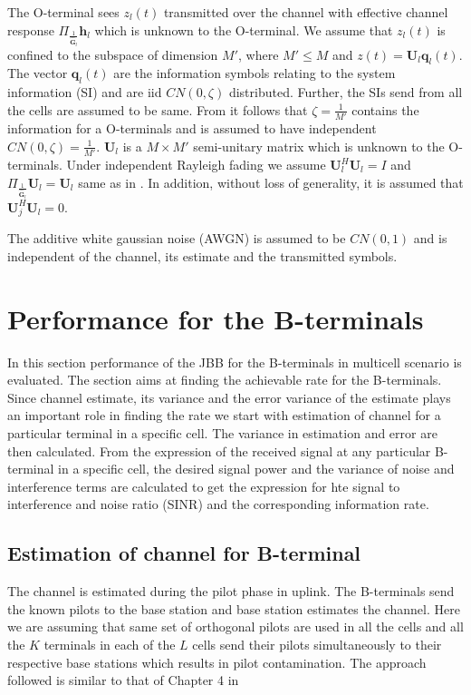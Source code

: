 \documentclass[10pt, a4paper, twoside,fleqn]{article}
\begin{document}
The O-terminal sees $z_l(t)$ transmitted over the channel with effective channel response $\Pi_{\frac{1}{\pmb{\hat G}_l}}\pmb{h}_l$ which is unknown to the O-terminal. We assume that $z_l(t)$ is confined to the subspace of dimension $M'$, where $M'\leq M$ and $z(t) = \pmb{U}_l\pmb{q}_l(t)$. The vector $\pmb{q}_l(t)$ are the information symbols relating to the system information (SI) and are iid $CN(0,\zeta)$ distributed. Further, the SIs send from all the cells are assumed to be same. From \cite{bib:jbb} it follows that $\zeta=\frac{1}{M'}$ contains the information for a O-terminals  and is assumed to have independent $CN(0, \zeta)=\frac{1}{M'}$. $\pmb{U}_l$ is a $M\times M'$ semi-unitary matrix which is unknown to the O-terminals. Under independent Rayleigh fading we assume $\pmb{U}_l^H\pmb{U}_l=I$ and $\Pi_{\frac{1}{\pmb{\hat G}_l}}\pmb{U}_l=\pmb{U}_l$ same as in \cite{bib:jbb}. In addition, without loss of generality, it is assumed that $\pmb{U}_j^H\pmb{U}_l=0$.

The additive white gaussian noise (AWGN) is assumed to be $CN(0,1)$ and is independent of the channel, its estimate and the transmitted symbols.

\section{Performance for the B-terminals}
	In this section performance of the JBB for the B-terminals in multicell scenario is evaluated. The section aims at finding the achievable rate for the B-terminals. Since channel estimate, its variance and the error variance of the estimate plays an important role in finding the rate we start with estimation of channel for a particular terminal in a specific cell. The variance in estimation and error are then calculated. From the expression of the received signal at any particular B-terminal in a specific cell, the desired signal power and the variance of noise and interference terms are calculated to get the expression for hte signal to interference and noise ratio (SINR) and the corresponding information rate.

\subsection{Estimation of channel for B-terminal} \label{sec:btchesti}
	The channel is estimated during the pilot phase in uplink. The B-terminals send the known pilots to the base station and base station estimates the channel. Here we are assuming that same set of orthogonal pilots are used in all the cells and all the $K$ terminals in each of the $L$ cells send their pilots simultaneously to their respective base stations which results in pilot contamination. The approach followed is similar to that of Chapter 4 in \cite{bib:MassiveMimoBook}
\end{document}
